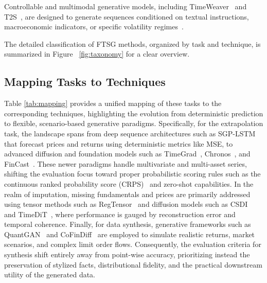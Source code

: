 Controllable and multimodal generative models, including TimeWeaver~\citep{narasimhan2024timeweaver} and T2S~\citep{T2S}, are designed to generate sequences conditioned on textual instructions, macroeconomic indicators, or specific volatility regimes~\citep{wang2024mtsisurvey}.

The detailed classification of FTSG methods, organized by task and technique, is summarized in Figure ~\ref{fig:taxonomy} for a clear overview.

\subsection{Mapping Tasks to Techniques}
Table \ref{tab:mapping} provides a unified mapping of these tasks to the corresponding techniques, highlighting the evolution from deterministic prediction to flexible, scenario-based generative paradigms. Specifically, for the extrapolation task, the landscape spans from deep sequence architectures such as SGP-LSTM~\citep{SGP-LSTM1} that forecast prices and returns using deterministic metrics like MSE, to advanced diffusion and foundation models such as TimeGrad~\citep{rasul2021timegrad}, Chronos~\citep{ansari2024chronos}, and FinCast~\citep{zhu2025fincast}. These newer paradigms handle multivariate and multi-asset series, shifting the evaluation focus toward proper probabilistic scoring rules such as the continuous ranked probability score (CRPS)~\citep{gneiting2007strictly} and zero-shot capabilities. In the realm of imputation, missing fundamentals and prices are primarily addressed using tensor methods such as RegTensor~\citep{zhou2023regtensor} and diffusion models such as CSDI~\citep{tashiro2021csdi} and TimeDiT~\citep{cao2024timedit}, where performance is gauged by reconstruction error and temporal coherence. Finally, for data synthesis, generative frameworks such as QuantGAN~\citep{wiese2020} and CoFinDiff~\citep{tanaka2025cofindiff} are employed to simulate realistic returns, market scenarios, and complex limit order flows. Consequently, the evaluation criteria for synthesis shift entirely away from point-wise accuracy, prioritizing instead the preservation of stylized facts, distributional fidelity, and the practical downstream utility of the generated data.

